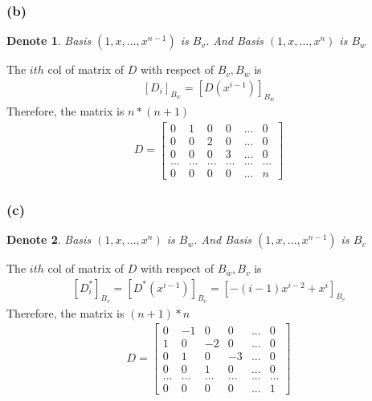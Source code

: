\documentclass{article}
\newtheorem*{denote}{Denote}
\begin{document}
\subsubsection*{(b)}
\begin{denote}
    Basis $(1, x, ..., x^{n-1})$ is $B_v$. And Basis $(1, x, ..., x^{n})$ is $B_w$
\end{denote}
The $ith$ col of matrix of $D$ with respect of $B_v, B_w$ is 
\begin{equation*}
    \begin{split}
        [D_i]_{B_w} = [D(x^{i-1})]_{B_w}
    \end{split}
\end{equation*}
Therefore, the matrix is $n*(n+1)$
\begin{equation*}
    \begin{split}
        D = \begin{bmatrix}
            0 & 1 & 0 & 0 & ... & 0 \\
            0 & 0 & 2 & 0 & ... & 0 \\
            0 & 0 & 0 & 3 & ... & 0 \\
            ... & ... & ... & ... & ... & ... \\
            0 & 0 & 0 & 0 & ... & n
        \end{bmatrix}
    \end{split}
\end{equation*}

\subsubsection*{(c)}
\begin{denote}
    Basis $(1, x, ..., x^{n})$ is $B_w$. And Basis $(1, x, ..., x^{n - 1})$ is $B_v$
\end{denote}
The $ith$ col of matrix of $D$ with respect of $B_w, B_v$ is 
\begin{equation*}
    \begin{split}
        [D^*_i]_{B_v} = [D^*(x^{i-1})]_{B_v} = [-(i-1)x^{i-2}+x^i]_{B_v}
    \end{split}
\end{equation*}
Therefore, the matrix is $(n+1)*n$
\begin{equation*}
    \begin{split}
        D = \begin{bmatrix}
            0 & -1 & 0 & 0 & ... & 0 \\
            1 & 0 & -2 & 0 & ... & 0 \\
            0 & 1 & 0 & -3 & ... & 0 \\
            0 & 0 & 1 & 0 & ... & 0 \\
            ... & ... & ... & ... & ... & ... \\
            0 & 0 & 0 & 0 & ... & 1
        \end{bmatrix}
    \end{split}
\end{equation*}
\end{document}
